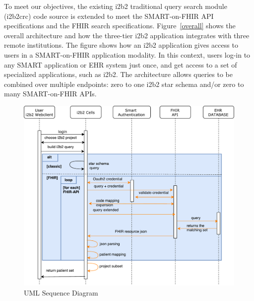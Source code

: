 \documentclass{amia}
\begin{document}
To meet our objectives, the existing i2b2 traditional query search module (i2b2crc) code source is extended to meet the SMART-on-FHIR API specifications and the FHIR search specifications. Figure~\ref{overall} shows the overall architecture and how the three-tier i2b2 application integrates with three remote institutions. The figure shows how an i2b2 application gives access to users in a SMART-on-FHIR application modality. In this context, users log-in to any SMART application or EHR system just once, and get access to a set of specialized applications, such as i2b2. The architecture allows queries to be combined over multiple endpoints: zero to one i2b2 star schema and/or zero to many SMART-on-FHIR APIs.

\begin{figure}[h]
\centering
\includegraphics[scale=.6]{sequence_diagram.pdf}
\caption{UML Sequence Diagram}
\label{seq}
\end{figure}
\end{document}
